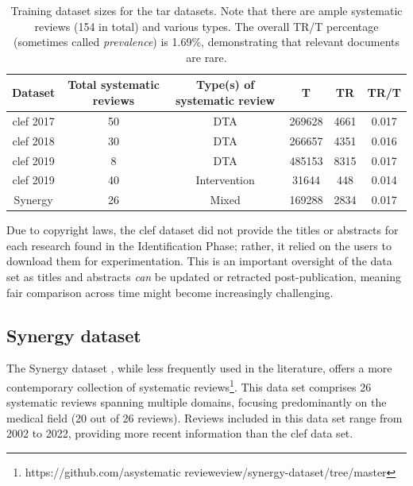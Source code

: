 \documentclass[10pt,oneside]{book}
\begin{document}
\begin{table}
    \centering
    \begin{tabular}{|c|c|c|c|c|c|}
    \hline
        Dataset & Total systematic reviews & Type(s) of systematic review & T & TR & TR/T\\   \hline
       \gls*{clef} 2017 & 50 & DTA & 269628 & 4661  & 0.017 \\   \hline
        \gls*{clef} 2018 & 30 & DTA & 266657 & 4351 & 0.016\\   \hline
        \gls*{clef}   2019 & 8 & DTA & 485153 & 8315 & 0.017\\   \hline
       \gls*{clef}  2019 & 40 & Intervention & 31644 &  448 & 0.014 \\   \hline
        Synergy & 26 & Mixed & 169288 &  2834 & 0.017 \\   \hline
    \end{tabular}
    \caption{Training dataset sizes for the \gls*{tar} datasets. Note that there are ample systematic reviews (154 in total) and various types. The overall TR/T percentage (sometimes called \emph{prevalence}) is 1.69\%, demonstrating that relevant documents are rare.}
    \label{tab:training_dataset_clef}
\end{table}

Due to copyright laws, the \gls*{clef} dataset did not provide the titles or abstracts for each research found in the Identification Phase; rather, it relied on the users to download them for experimentation. This is an important oversight of the data set as titles and abstracts \emph{can} be updated or retracted post-publication, meaning fair comparison across time might become increasingly challenging.

\subsection{Synergy dataset}
The Synergy dataset \cite{de_bruin_synergy_2023}, while less frequently used in the literature, offers a more contemporary collection of systematic reviews\footnote{https://github.com/asystematic revieweview/synergy-dataset/tree/master}. This data set comprises 26 systematic reviews spanning multiple domains, focusing predominantly on the medical field (20 out of 26 reviews). Reviews included in this data set range from 2002 to 2022, providing more recent information than the \gls*{clef} data set.
\end{document}

